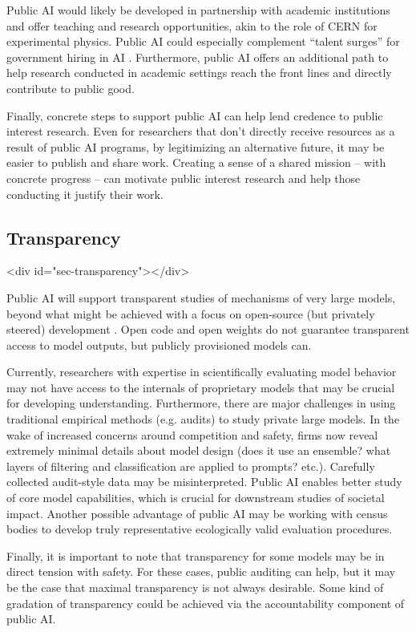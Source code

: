 \documentclass{article}
\begin{document}
Public AI would likely be developed in partnership with academic institutions and offer teaching and research opportunities, akin to the role of CERN for experimental physics. Public AI could especially complement ``talent surges'' for government hiring in AI \cite{thewhitehouseFACTSHEETPresident2023}. Furthermore, public AI offers an additional path to help research conducted in academic settings reach the front lines and directly contribute to public good. 

Finally, concrete steps to support public AI can help lend credence to public interest research. Even for researchers that don't directly receive resources as a result of public AI programs, by legitimizing an alternative future, it may be easier to publish and share work. Creating a sense of a shared mission -- with concrete progress -- can motivate public interest research and help those conducting it justify their work.

\subsection{Transparency} <div id="sec-transparency"></div>

Public AI will support transparent studies of mechanisms of very large models, beyond what might be achieved with a focus on open-source (but privately steered) development \cite{widderOpenBusinessBig2023}. Open code and open weights do not guarantee transparent access to model outputs, but publicly provisioned models can.

Currently, researchers with expertise in scientifically evaluating model behavior may not have access to the internals of proprietary models that may be crucial for developing understanding. Furthermore, there are major challenges in using traditional empirical methods (e.g. audits) to study private large models. In the wake of increased concerns around competition and safety, firms now reveal extremely minimal details about model design (does it use an ensemble? what layers of filtering and classification are applied to prompts? etc.). Carefully collected audit-style data may be misinterpreted. Public AI enables better study of core model capabilities, which is crucial for downstream studies of societal impact. Another possible advantage of public AI may be working with census bodies to develop truly representative ecologically valid evaluation procedures.

Finally, it is important to note that transparency for some models may be in direct tension with safety. For these cases, public auditing can help, but it may be the case that maximal transparency is not always desirable. Some kind of gradation of transparency could be achieved via the accountability component of public AI.
\end{document}
